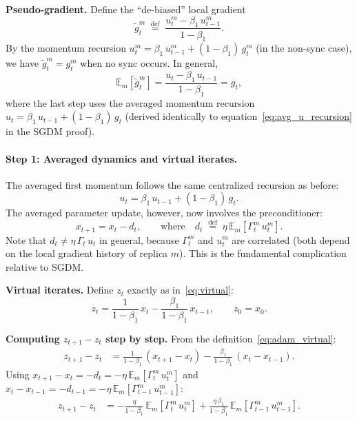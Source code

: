 \documentclass{article}
\begin{document}
\medskip
\noindent\textbf{Pseudo-gradient.}
Define the ``de-biased'' local gradient
\begin{equation}
\widetilde{g}_t^m \;\stackrel{\text{def}}{=}\;
\frac{u_t^m - \beta_1\,u_{t-1}^m}{1 - \beta_1}.
\label{eq:gtilde_def}
\end{equation}
By the momentum recursion $u_t^m = \beta_1\,u_{t-1}^m + (1-\beta_1)\,g_t^m$
(in the non-sync case), we have $\widetilde{g}_t^m = g_t^m$ when no sync
occurs. In general,
\begin{equation}
\mathbb{E}_m[\widetilde{g}_t^m]
= \frac{u_t - \beta_1\,u_{t-1}}{1 - \beta_1}
= g_t,
\label{eq:gtilde_avg}
\end{equation}
where the last step uses the averaged momentum recursion
$u_t = \beta_1\,u_{t-1} + (1-\beta_1)\,g_t$ (derived identically to
equation~\eqref{eq:avg_u_recursion} in the SGDM proof).

\paragraph{Step 1: Averaged dynamics and virtual iterates.}

The averaged first momentum follows the same centralized recursion as before:
\begin{equation}
u_t = \beta_1\,u_{t-1} + (1-\beta_1)\,g_t.
\label{eq:adam_avg_u}
\end{equation}
The averaged parameter update, however, now involves the preconditioner:
\begin{equation}
x_{t+1} = x_t - d_t,
\qquad\text{where}\quad
d_t \;\stackrel{\text{def}}{=}\;
\eta\,\mathbb{E}_m[\Gamma_t^m\,u_t^m].
\label{eq:adam_avg_x}
\end{equation}
Note that $d_t \neq \eta\,\Gamma_t\,u_t$ in general, because $\Gamma_t^m$ and
$u_t^m$ are correlated (both depend on the local gradient history of
replica $m$). This is the fundamental complication relative to SGDM.

\medskip
\noindent\textbf{Virtual iterates.}
Define $z_t$ exactly as in~\eqref{eq:virtual}:
\begin{equation}
z_t = \frac{1}{1-\beta_1}\,x_t - \frac{\beta_1}{1-\beta_1}\,x_{t-1},
\qquad z_0 = x_0.
\label{eq:adam_virtual}
\end{equation}

\noindent\textbf{Computing $z_{t+1} - z_t$ step by step.}
From the definition~\eqref{eq:adam_virtual}:
\begin{align}
z_{t+1} - z_t
&= \frac{1}{1-\beta_1}\,(x_{t+1} - x_t)
   - \frac{\beta_1}{1-\beta_1}\,(x_t - x_{t-1}).
\label{eq:adam_zdiff_1}
\end{align}
Using $x_{t+1} - x_t = -d_t = -\eta\,\mathbb{E}_m[\Gamma_t^m\,u_t^m]$ and
$x_t - x_{t-1} = -d_{t-1} = -\eta\,\mathbb{E}_m[\Gamma_{t-1}^m\,u_{t-1}^m]$:
\begin{align}
z_{t+1} - z_t
&= -\frac{\eta}{1-\beta_1}\,\mathbb{E}_m[\Gamma_t^m\,u_t^m]
   + \frac{\eta\,\beta_1}{1-\beta_1}\,\mathbb{E}_m[\Gamma_{t-1}^m\,u_{t-1}^m].
\label{eq:adam_zdiff_2}
\end{align}
\end{document}
